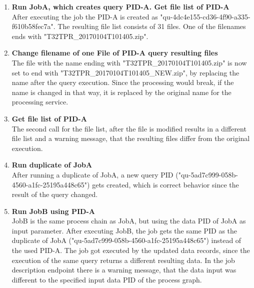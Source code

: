 \documentclass[draft,final]{vutinfth} %
\begin{document}
\begin{enumerate}
	\item \textbf{Run JobA, which creates query PID-A. Get file list of PID-A} \\
	After executing the job the PID-A is created as "qu-4dc4e155-cd36-4f90-a335-f610b58fec7a". The resulting file list consists of 31 files. One of the filenames ends with "T32TPR\_20170104T101405.zip". 
	\item \textbf{Change filename of one File of PID-A query resulting files} \\
	The file with the name ending with "T32TPR\_20170104T101405.zip" is now set to end with "T32TPR\_20170104T101405\_NEW.zip", by replacing the name after the query execution. Since the processing would break, if the name is changed in that way, it is replaced by the original name for the processing service.  
	\item \textbf{Get file list of PID-A} \\
	The second call for the file list, after the file is modified results in a different file list and a warning message, that the resulting files differ from the original execution.
	\item \textbf{Run duplicate of JobA} \\
	After running a duplicate of JobA, a new query PID ("qu-5ad7c999-058b-4560-a1fc-25195a448c65") gets created, which is correct behavior since the result of the query changed. 
	\item \textbf{Run JobB using PID-A}\\
	JobB is the same process chain as JobA, but using the data PID of JobA as input parameter. After executing JobB, the job gets the same PID as the duplicate of JobA ("qu-5ad7c999-058b-4560-a1fc-25195a448c65") instead of the used PID-A. The job got executed by the updated data records, since the execution of the same query returns a different resulting data. In the job description endpoint there is a warning message, that the data input was different to the specified input data PID of the process graph. 
\end{enumerate}
\end{document}
